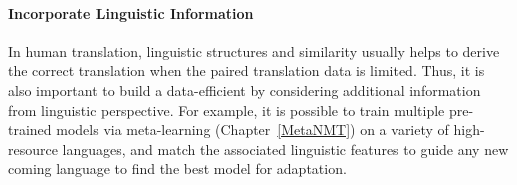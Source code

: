 \paragraph{Incorporate Linguistic Information}
In  human translation, linguistic structures and similarity usually helps to derive the correct translation when the paired translation data is limited. Thus, it is also important to build a data-efficient by considering additional information from linguistic perspective. For example, it is possible to train multiple pre-trained models via meta-learning (Chapter~\ref{MetaNMT}) on a variety of high-resource languages, and match the associated linguistic features to guide any new coming language to find the best model for adaptation.



